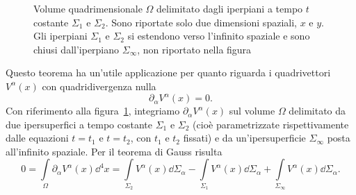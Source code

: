 \begin{figure}
  \centering
  \caption[Volume quadrimensionale delimitato da iperpiani a tempo
  costante]{Volume quadrimensionale $\Omega$ delimitato dagli iperpiani a tempo
    $t$ costante $\Sigma_{1}$ e $\Sigma_{2}$.  Sono riportate solo due
    dimensioni spaziali, $x$ e $y$.  Gli iperpiani $\Sigma_{1}$ e $\Sigma_{2}$
    si estendono verso l'infinito spaziale e sono chiusi dall'iperpiano
    $\Sigma_{\infty}$, non riportato nella figura}
  \label{fig:teorema-gauss}
\end{figure}
Questo teorema ha un'utile applicazione per quanto riguarda i quadrivettori
$V^{\alpha}(x)$ con quadridivergenza nulla
\begin{equation}
  \partial_{\alpha}V^{\alpha}(x) = 0.
\end{equation}
Con riferimento alla figura~\ref{fig:teorema-gauss}, integriamo
$\partial_{\alpha}V^{\alpha}(x)$ sul volume $\Omega$ delimitato da due
ipersuperfici a tempo costante $\Sigma_{1}$ e $\Sigma_{2}$ (cioè parametrizzate
rispettivamente dalle equazioni $t = t_{1}$ e $t = t_{2}$, con $t_{1}$ e $t_{2}$
fissati) e da un'ipersuperficie $\Sigma_{\infty}$ posta all'infinito spaziale.
Per il teorema di Gauss risulta
\begin{equation}
  0 = \int\limits_{\Omega} \partial_{\alpha}V^{\alpha}(x) \dd^{4}x =
  \int\limits_{\Sigma_{2}} V^{\alpha}(x) \dd\Sigma_{\alpha} -
  \int\limits_{\Sigma_{1}} V^{\alpha}(x) \dd\Sigma_{\alpha} +
  \int\limits_{\Sigma_{\infty}} V^{\alpha}(x) \dd\Sigma_{\alpha}.
\end{equation}
